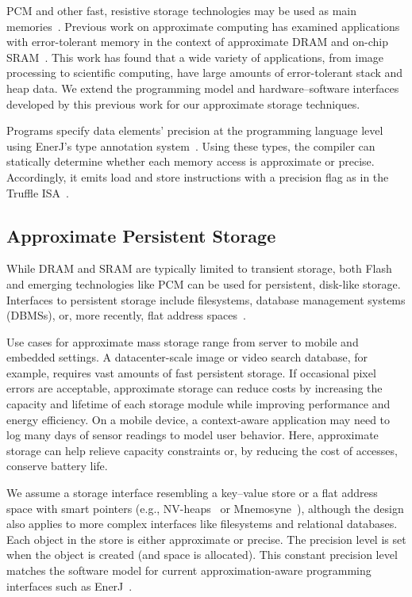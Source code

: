 PCM and other fast, resistive storage technologies may be used 
as main memories~\cite{pcm-dram-alt,durable-pcm-mm,qureshi-pcm-mm}.
Previous work on approximate computing has examined applications with
error-tolerant memory in the context of approximate DRAM and
on-chip SRAM~\cite{flikker,enerj,truffle}. This work has found that
a wide variety of applications, from image processing to scientific
computing, have large amounts of error-tolerant stack and heap data.
We extend the programming model and hardware--software interfaces
developed by this previous work for our approximate storage
techniques.

Programs specify data elements' precision at the programming language level using EnerJ's
type annotation system~\cite{enerj}.
Using these types, the compiler
can statically determine whether each memory access is approximate or
precise. Accordingly, it emits load and store instructions with a
precision flag as in the Truffle ISA~\cite{truffle}.

\subsection{Approximate Persistent Storage}

While DRAM and SRAM are typically limited to transient storage,
both Flash and emerging technologies like PCM can be used for
persistent, disk-like storage. 
Interfaces to persistent storage include
filesystems, database management systems (DBMSs),
or, more recently, flat address spaces~\cite{nvheaps,mnemosyne}.

Use cases
for approximate mass storage range from server to mobile and embedded
settings. A datacenter-scale image or video search database, for example,
requires vast amounts of fast persistent storage. If occasional
pixel errors are acceptable, approximate storage can reduce costs by
increasing the capacity and lifetime of each storage module while improving
performance and energy efficiency. On a mobile device, a
context-aware application may need to log many days of sensor readings to
model user behavior. Here, approximate storage can help relieve capacity
constraints or, by reducing the cost of accesses,
conserve battery life.

We assume a storage interface resembling a key--value store or a flat address
space with smart pointers (e.g., NV-heaps~\cite{nvheaps} or
Mnemosyne~\cite{mnemosyne}), although the design also applies to more
complex interfaces like filesystems and relational databases. Each
object in the store is either approximate or precise. The precision level is
set when the object is created (and space is allocated).
This constant precision level matches the software model for current
approximation-aware programming interfaces such as EnerJ~\cite{enerj}.

